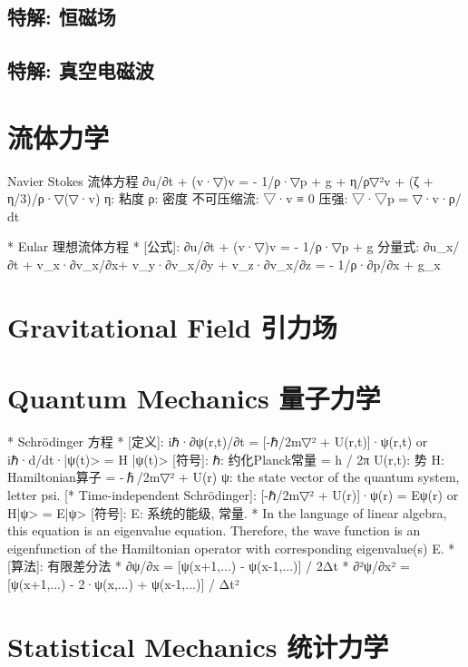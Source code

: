 \documentclass{article}
\begin{document}
\subsection{特解: 恒磁场}


\subsection{特解: 真空电磁波}



\section{流体力学}
    Navier Stokes 流体方程
    ∂\vec u/∂t + (\vec v·▽)\vec v =  - 1/ρ·▽p  + \vec g + η/ρ▽²\vec v + (ζ + η/3)/ρ·▽(▽·\vec v)
			η: 粘度    ρ: 密度
			不可压缩流: ▽·\vec v ≡ 0
			压强: ▽·▽p = ▽·v·ρ/ dt

*                   Eular 理想流体方程
*	[公式]: ∂\vec u/∂t + (\vec v·▽)\vec v = - 1/ρ·▽p + \vec g
		分量式:
			∂u_x/∂t + v_x·∂v_x/∂x+ v_y·∂v_x/∂y + v_z·∂v_x/∂z = - 1/ρ·∂p/∂x + g_x


\section{Gravitational Field 引力场}



\section{Quantum Mechanics 量子力学}
*                    Schrödinger 方程
*	[定义]: iℏ·∂ψ(r,t)/∂t = [-ℏ/2m▽² + U(r,t)]·ψ(r,t)
		or	iℏ·d/dt·|ψ(t)> = H |ψ(t)>
		[符号]:
			ℏ: 约化Planck常量 = h / 2π    U(r,t): 势
			H: Hamiltonian算子 = -ℏ/2m▽² + U(r)
			ψ: the state vector of the quantum system, letter psi.
		[* Time-independent Schrödinger]:
			[-ℏ/2m▽² + U(r)]·ψ(r)  = Eψ(r)
		or	H|ψ> = E|ψ>
		[符号]: E: 系统的能级, 常量.
		* In the language of linear algebra, this equation is an eigenvalue equation.
		  Therefore, the wave function is an eigenfunction of the Hamiltonian operator
		  with corresponding eigenvalue(s) E.
*	[算法]: 有限差分法
		* ∂ψ/∂x   = [ψ(x+1,...) - ψ(x-1,...)] / 2Δt
		* ∂²ψ/∂x² = [ψ(x+1,...) - 2·ψ(x,...) + ψ(x-1,...)] / Δt²


\section{Statistical Mechanics 统计力学}
\end{document}
